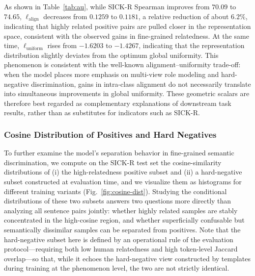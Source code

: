 \documentclass[a4paper,fleqn]{cas-dc}
\begin{document}
As shown in Table~\ref{tab:au}, while SICK-R Spearman improves from $70.09$ to $74.65$, $\ell_{\mathrm{align}}$ decreases from $0.1259$ to $0.1181$, a relative reduction of about $6.2\%$, indicating that highly related positive pairs are pulled closer in the representation space, consistent with the observed gains in fine-grained relatedness. At the same time, $\ell_{\mathrm{uniform}}$ rises from $-1.6203$ to $-1.4267$, indicating that the representation distribution slightly deviates from the optimum global uniformity. This phenomenon is consistent with the well-known alignment--uniformity trade-off: when the model places more emphasis on multi-view role modeling and hard-negative discrimination, gains in intra-class alignment do not necessarily translate into simultaneous improvements in global uniformity. These geometric scalars are therefore best regarded as complementary explanations of downstream task results, rather than as substitutes for indicators such as SICK-R.

\subsubsection{Cosine Distribution of Positives and Hard Negatives}
\label{subsec:cosine-dist}

To further examine the model's separation behavior in fine-grained semantic discrimination, we compute on the SICK-R test set the cosine-similarity distributions of (i) the high-relatedness positive subset and (ii) a hard-negative subset constructed at evaluation time, and we visualize them as histograms for different training variants (Fig.~\ref{fig:cosine-dist}). Studying the conditional distributions of these two subsets answers two questions more directly than analyzing all sentence pairs jointly: whether highly related samples are stably concentrated in the high-cosine region, and whether superficially confusable but semantically dissimilar samples can be separated from positives. Note that the hard-negative subset here is defined by an operational rule of the evaluation protocol---requiring both low human relatedness and high token-level Jaccard overlap---so that, while it echoes the hard-negative view constructed by templates during training at the phenomenon level, the two are not strictly identical.
\end{document}
